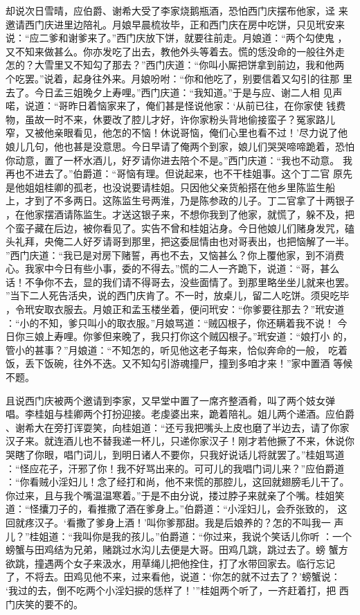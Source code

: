 却说次日雪晴，应伯爵、谢希大受了李家烧鹅瓶酒，恐怕西门庆摆布他家，迳
来邀请西门庆进里边陪礼。月娘早晨梳妆毕，正和西门庆在房中吃饼，只见玳安来
说：“应二爹和谢爹来了。”西门庆放下饼，就要往前走。月娘道：“两个勾使鬼
，又不知来做甚么。你亦发吃了出去，教他外头等着去。慌的恁没命的一般往外走
怎的？大雪里又不知勾了那去？”西门庆道：“你叫小厮把饼拿到前边，我和他两
个吃罢。”说着，起身往外来。月娘吩咐：“你和他吃了，别要信着又勾引的往那
里去了。今日孟三姐晚夕上寿哩。”西门庆道：“我知道。”于是与应、谢二人相
见声喏，说道：“哥昨日着恼家来了，俺们甚是怪说他家：‘从前已往，在你家使
钱费物，虽故一时不来，休要改了腔儿才好，许你家粉头背地偷接蛮子？冤家路儿
窄，又被他亲眼看见，他怎的不恼！休说哥恼，俺们心里也看不过！’尽力说了他
娘儿几句，他也甚是没意思。今日早请了俺两个到家，娘儿们哭哭啼啼跪着，恐怕
你动意，置了一杯水酒儿，好歹请你进去陪个不是。”西门庆道：“我也不动意。
我再也不进去了。”伯爵道：“哥恼有理。但说起来，也不干桂姐事。这个丁二官
原先是他姐姐桂卿的孤老，也没说要请桂姐。只因他父亲货船搭在他乡里陈监生船
上，才到了不多两日。这陈监生号两淮，乃是陈参政的儿子。丁二官拿了十两银子
，在他家摆酒请陈监生。才送这银子来，不想你我到了他家，就慌了，躲不及，把
个蛮子藏在后边，被你看见了。实告不曾和桂姐沾身。今日他娘儿们赌身发咒，磕
头礼拜，央俺二人好歹请哥到那里，把这委屈情由也对哥表出，也把恼解了一半。
”西门庆道：“我已是对房下赌誓，再也不去，又恼甚么？你上覆他家，到不消费
心。我家中今日有些小事，委的不得去。”慌的二人一齐跪下，说道：“哥，甚么
话！不争你不去，显的我们请不得哥去，没些面情了。到那里略坐坐儿就来也罢。
”当下二人死告活央，说的西门庆肯了。不一时，放桌儿，留二人吃饼。须臾吃毕
，令玳安取衣服去。月娘正和孟玉楼坐着，便问玳安：“你爹要往那去？”玳安道
：“小的不知，爹只叫小的取衣服。”月娘骂道：“贼囚根子，你还瞒着我不说！
今日你三娘上寿哩。你爹但来晚了，我只打你这个贼囚根子。”玳安道：“娘打小
的，管小的甚事？”月娘道：“不知怎的，听见他这老子每来，恰似奔命的一般，
吃着饭，丢下饭碗，往外不迭。又不知勾引游魂撞尸，撞到多咱才来！”家中置酒
等候不题。

且说西门庆被两个邀请到李家，又早堂中置了一席齐整酒肴，叫了两个妓女弹
唱。李桂姐与桂卿两个打扮迎接。老虔婆出来，跪着陪礼。姐儿两个递酒。应伯爵
、谢希大在旁打诨耍笑，向桂姐道：“还亏我把嘴头上皮也磨了半边去，请了你家
汉子来。就连酒儿也不替我递一杯儿，只递你家汉子！刚才若他撅了不来，休说你
哭瞎了你眼，唱门词儿，到明日诸人不要你，只我好说话儿将就罢了。”桂姐骂道
：“怪应花子，汗邪了你！我不好骂出来的。可可儿的我唱门词儿来？”应伯爵道
：“你看贼小淫妇儿！念了经打和尚，他不来慌的那腔儿，这回就翅膀毛儿干了。
你过来，且与我个嘴温温寒着。”于是不由分说，搂过脖子来就亲了个嘴。桂姐笑
道：“怪攮刀子的，看推撒了酒在爹身上。”伯爵道：“小淫妇儿，会乔张致的，
这回就疼汉子。‘看撒了爹身上酒！’叫你爹那甜。我是后娘养的？怎的不叫我一
声儿？”桂姐道：“我叫你是我的孩儿。”伯爵道：“你过来，我说个笑话儿你听
：一个螃蟹与田鸡结为兄弟，赌跳过水沟儿去便是大哥。田鸡几跳，跳过去了。螃
蟹方欲跳，撞遇两个女子来汲水，用草绳儿把他拴住，打了水带回家去。临行忘记
了，不将去。田鸡见他不来，过来看他，说道：‘你怎的就不过去了？’螃蟹说：
‘我过的去，倒不吃两个小淫妇捩的恁样了！’”桂姐两个听了，一齐赶着打，把
西门庆笑的要不的。

